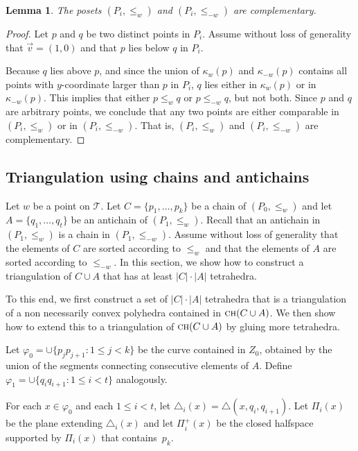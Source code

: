 \documentclass[a4paper, 11pt]{article}
\newtheorem{lemma}[theorem]{Lemma}
\newcommand{\ve}{{\ensuremath{\vec{v}}}}
\newcommand{\we}{{\ensuremath{w}}}
\newcommand{\cone}[1]{\ensuremath{\kappa_{\we}(#1)}}
\newcommand{\ch}[1]{\ensuremath{\textsc{ch}(#1)}}
\newcommand{\lt}{\ensuremath{ \leq_{\we}}}
\newcommand{\ltc}{\ensuremath{ \leq_{-\we}}}
\newcommand{\torus}{\ensuremath{\mathcal T}}
\begin{document}
\begin{lemma}\label{lemma:Properties of poset}
The posets $(P_i, \lt)$ and $(P_i, \ltc)$  are complementary.
\end{lemma}
\begin{proof}
Let $p$ and $q$ be two distinct points in $P_i$. 
Assume without loss of generality that $\ve = (1,0)$ and that $p$ lies below $q$ in $P_i$.

Because $q$ lies above $p$, and since the union of $\cone{p}$ and $\kappa_{-\we}(p)$ contains all points with $y$-coordinate larger than $p$ in $P_i$, $q$ lies either in $\cone{p}$ or in $\kappa_{-\we}(p)$.
This implies that either $p\lt q$ or $p\ltc q$, but not both. 
Since $p$ and $q$ are arbitrary points, we conclude that any two points are either comparable in $(P_i, \lt)$ or in $(P_i, \ltc)$.
That is, $(P_i, \lt)$ and $(P_i, \ltc)$  are complementary.
\end{proof}

\subsection{Triangulation using chains and antichains}
Let $\we$ be a point on $\torus$.
Let $C = \{p_1, \ldots, p_k\}$ be a chain of $(P_0, \lt)$ and let $A = \{q_1, \ldots, q_t\}$ be  an antichain of $(P_1, \lt)$.
Recall that an antichain in $(P_1, \lt)$ is a chain in $(P_1, \ltc)$.
Assume without loss of generality that the elements of $C$ are sorted according to $\lt$ and that the elements of $A$ are sorted according to $\ltc$.
In this section, we show how to construct a triangulation of $C\cup A$ that has at least $|C|\cdot |A|$ tetrahedra.

To this end, we first construct a set of $|C|\cdot|A|$ tetrahedra that is a triangulation of a non necessarily convex polyhedra contained in $\ch{C\cup A}$. We then show how to extend this to a triangulation of $\ch{C\cup A}$ by gluing more tetrahedra.

Let $\varphi_0 = \cup\{p_j p_{j+1} : 1\leq j < k\}$ be the curve contained in $Z_0$, obtained by the union of the segments connecting consecutive elements of $A$. Define $\varphi_1 = \cup\{q_i  q_{i+1} : 1\leq i< t\}$ analogously.

For each $x\in \varphi_0$ and each $1\leq i < t$, let $\triangle_i(x) = \triangle(x, q_i, q_{i+1})$.
Let $\Pi_i(x)$ be the plane extending $\triangle_i(x)$ and let $\Pi^+_i(x)$ be the closed halfspace supported by $\Pi_i(x)$ that contains~$p_k$.
\end{document}

